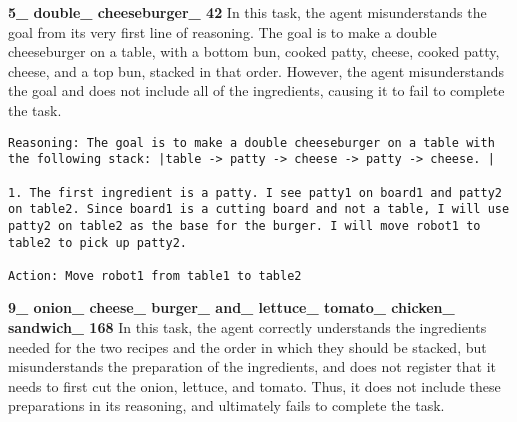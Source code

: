 \textbf{5\_ double\_ cheeseburger\_ 42} In this task, the agent misunderstands the goal from its very first line of reasoning. The goal is to make a double cheeseburger on a table, with a bottom bun, cooked patty, cheese, cooked patty, cheese, and a top bun, stacked in that order. However, the agent misunderstands the goal and does not include all of the ingredients, causing it to fail to complete the task. 


\begin{lstlisting}
Reasoning: The goal is to make a double cheeseburger on a table with the following stack: |table -> patty -> cheese -> patty -> cheese. |

1. The first ingredient is a patty. I see patty1 on board1 and patty2 on table2. Since board1 is a cutting board and not a table, I will use patty2 on table2 as the base for the burger. I will move robot1 to table2 to pick up patty2.

Action: Move robot1 from table1 to table2
\end{lstlisting}

\textbf{9\_ onion\_ cheese\_ burger\_ and\_ lettuce\_ tomato\_ chicken\_ sandwich\_ 168} In this task, the agent correctly understands the ingredients needed for the two recipes and the order in which they should be stacked, but misunderstands the preparation of the ingredients, and does not register that it needs to first cut the onion, lettuce, and tomato. Thus, it does not include these preparations in its reasoning, and ultimately fails to complete the task. 


